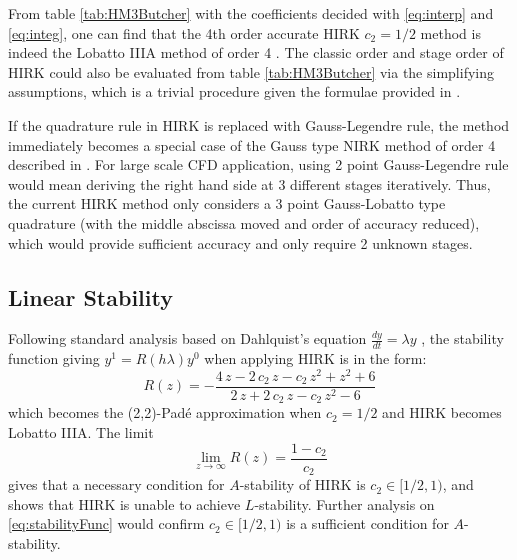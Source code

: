 \documentclass[preprint,12pt]{elsarticle}
\begin{document}
From table \ref{tab:HM3Butcher} with the coefficients
decided with \eqref{eq:interp} and \eqref{eq:integ},
one can find that the 4th order accurate
HIRK $c_2=1/2$ method is indeed the Lobatto IIIA method
of order 4 \cite{wanner1996solving}.
The classic order and stage order of HIRK could
also be evaluated from table \ref{tab:HM3Butcher} via
the simplifying assumptions, which is a trivial procedure
given the formulae provided in \cite{wanner1996solving}.

If the quadrature rule in HIRK is
replaced with Gauss-Legendre rule,
the method immediately becomes a special case of the
Gauss type NIRK method of order 4
described in \cite{kulikov2006familyNIRKOrig}.
For large scale CFD application,
using 2 point Gauss-Legendre rule
would mean deriving the right hand side at
3 different stages iteratively.
Thus, the current HIRK method only considers
a 3 point Gauss-Lobatto type quadrature
(with the middle abscissa moved and order of accuracy reduced),
which would provide sufficient accuracy and only require 2 unknown stages.




\subsection{Linear Stability}
\label{ssec:linStab}

Following standard analysis based on Dahlquist's equation
$\frac{dy}{dt} = \lambda y$ \cite{wanner1996solving},
the stability function giving $y^{1}=R(h\lambda)y^0$
when applying HIRK is in the form:
\begin{equation}
    \label{eq:stabilityFunc}
    R(z) = -\frac{4\,z-2\,c_{2}\,z-c_{2}\,z^2+z^2+6}{2\,z+2\,c_{2}\,z-c_{2}\,z^2-6}
\end{equation}
which becomes the (2,2)-Pad{\'e} approximation when $c_2=1/2$ and HIRK
becomes Lobatto IIIA. The limit
\begin{equation}
    \lim_{z\rightarrow\infty}R(z) = \frac{1-c_2}{c_2}
\end{equation}
gives that a necessary condition for $A$-stability of
HIRK is $c_2 \in [1/2,1)$, and shows that HIRK
is unable to achieve $L$-stability.
Further analysis on \eqref{eq:stabilityFunc}
would confirm $c_2 \in [1/2,1)$ is a sufficient
condition for $A$-stability.
\end{document}
